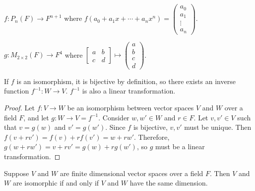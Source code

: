 \begin{exmp}
    $f: P_n(F) \to F^{n+1}$ where $f(a_0 + a_1x + \cdots + a_nx^n) = \begin{pmatrix}
        a_0 \\ a_1 \\ \vdots \\ a_n
    \end{pmatrix}$.
\end{exmp}

\begin{exmp}
    $g: M_{2\times2}(F) \to F^4$ where $\begin{bmatrix}
        a & b \\ c & d
    \end{bmatrix} \mapsto \begin{pmatrix}
        a \\ b \\ c \\ d
    \end{pmatrix}$.
\end{exmp}

\begin{prop}
    If $f$ is an isomorphism, it is bijective by definition, so there exists an inverse function $f^{-1}: W \to V$. $f^{-1}$ is also a linear transformation.
\end{prop}

\begin{proof}
    Let $f: V \to W$ be an isomorphism between vector spaces $V$ and $W$ over a field $F$, and let $g: W \to V = f^{-1}$. Consider $w, w' \in W$ and $r \in F$. Let $v, v' \in V$ such that $v = g(w)$ and $v' = g(w')$. Since $f$ is bijective, $v, v'$ must be unique. Then $f(v + rv') = f(v) + rf(v') = w + rw'$. Therefore, $g(w + rw') = v + rv' = g(w) + rg(w')$, so $g$ must be a linear transformation.
\end{proof}

\begin{thm}
    Suppose $V$ and $W$ are finite dimensional vector spaces over a field $F$. Then $V$ and $W$ are isomorphic if and only if $V$ and $W$ have the same dimension.
\end{thm}

